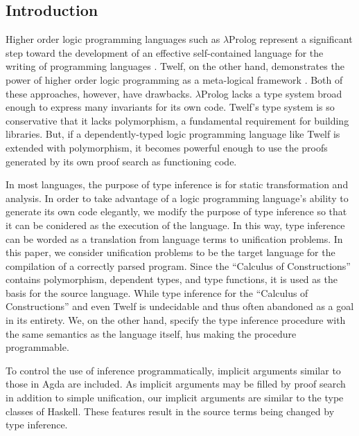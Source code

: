 \subsection{Introduction}



Higher order logic programming languages such as $\lambda$Prolog represent a significant
step toward the development of an effective self-contained language for the writing 
of programming languages \citep{miller1988overview}. 
Twelf, on the other hand,
demonstrates the power of higher order logic programming as a meta-logical framework
\citep{pfenning1999system}. Both of these approaches, however, have drawbacks. $\lambda$Prolog lacks a type system broad enough to express many invariants for its own code. Twelf’s type system
is so conservative that it lacks polymorphism, a fundamental requirement for building
libraries. But, if a dependently-typed logic programming language like Twelf is extended with polymorphism, it becomes powerful enough to use the proofs generated
by its own proof search as functioning code. 

In most languages, the purpose of type inference is for static transformation and 
analysis. 
In order to take advantage of a logic programming language’s ability to generate its own code elegantly, we modify the purpose of type
inference so that it can be conidered as the execution of the language.
In this way, type inference can be worded as a translation from language terms to unification
problems. In this paper, we consider unification problems to be the target
language for the compilation of a correctly parsed program. Since the ``Calculus of Constructions''
\citep{coquand1986calculus} contains polymorphism, dependent types, and type functions, it is used
as the basis for the source language. While type inference for the ``Calculus of Constructions'' and even Twelf is undecidable\citep{Dowek93tlca} and thus often abandoned as a goal in its entirety. We, on the other hand, specify the 
type inference procedure with the same semantics as the language itself,
hus making the procedure programmable.

To control the use of inference programmatically, implicit arguments similar to those
in Agda are included. As implicit arguments may be filled by proof search in addition
to simple unification, our implicit arguments are similar to the type classes of Haskell. 
These features result in the source terms being changed by type inference.

